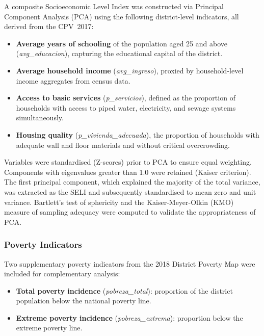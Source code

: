 \documentclass[12pt,a4paper,twoside]{article}
\begin{document}
A composite Socioeconomic Level Index was constructed via Principal Component
Analysis (PCA) using the following district-level indicators, all derived from
the CPV~2017:

\begin{itemize}
  \item \textbf{Average years of schooling} of the population aged 25 and above
        (\textit{avg\_educacion}), capturing the educational capital of the district.
  \item \textbf{Average household income} (\textit{avg\_ingreso}), proxied by
        household-level income aggregates from census data.
  \item \textbf{Access to basic services} (\textit{p\_servicios}), defined as the
        proportion of households with access to piped water, electricity, and
        sewage systems simultaneously.
  \item \textbf{Housing quality} (\textit{p\_vivienda\_adecuada}), the proportion
        of households with adequate wall and floor materials and without critical
        overcrowding.
\end{itemize}

Variables were standardised (Z-scores) prior to PCA to ensure equal weighting.
Components with eigenvalues greater than 1.0 were retained (Kaiser criterion).
The first principal component, which explained the majority of the total variance,
was extracted as the SELI and subsequently standardised to mean zero and unit
variance. Bartlett's test of sphericity and the Kaiser-Meyer-Olkin (KMO) measure
of sampling adequacy were computed to validate the appropriateness of PCA.

\subsubsection{Poverty Indicators}

Two supplementary poverty indicators from the 2018 District Poverty Map were
included for complementary analysis:

\begin{itemize}
  \item \textbf{Total poverty incidence} (\textit{pobreza\_total}): proportion of
        the district population below the national poverty line.
  \item \textbf{Extreme poverty incidence} (\textit{pobreza\_extrema}): proportion
        below the extreme poverty line.
\end{itemize}
\end{document}
